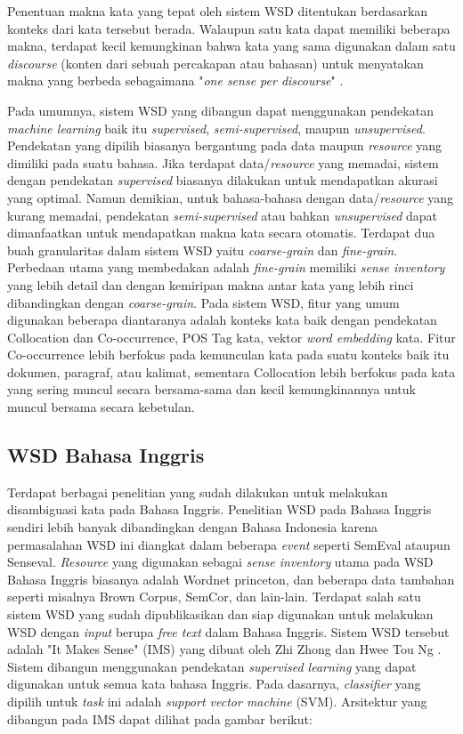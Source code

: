 Penentuan makna kata yang tepat oleh sistem WSD ditentukan berdasarkan konteks dari kata tersebut berada. Walaupun satu kata dapat memiliki beberapa makna, terdapat kecil kemungkinan bahwa kata yang sama digunakan dalam satu \textit{discourse} (konten dari sebuah percakapan atau bahasan) untuk menyatakan makna yang berbeda sebagaimana "\textit{one sense per discourse}" \citep{gale1992one}.

Pada umumnya, sistem WSD yang dibangun dapat menggunakan pendekatan \textit{machine learning} baik itu \textit{supervised}, \textit{semi-supervised}, maupun \textit{unsupervised}. Pendekatan yang dipilih biasanya bergantung pada data maupun \textit{resource} yang dimiliki pada suatu bahasa. Jika terdapat data/\textit{resource} yang memadai, sistem dengan pendekatan \textit{supervised} biasanya dilakukan untuk mendapatkan akurasi yang optimal. Namun demikian, untuk bahasa-bahasa dengan data/\textit{resource} yang kurang memadai, pendekatan \textit{semi-supervised} atau bahkan \textit{unsupervised} dapat dimanfaatkan untuk mendapatkan makna kata secara otomatis. Terdapat dua buah granularitas dalam sistem WSD yaitu \textit{coarse-grain} dan \textit{fine-grain}. Perbedaan utama yang membedakan adalah \textit{fine-grain} memiliki \textit{sense inventory} yang lebih detail dan dengan kemiripan makna antar kata yang lebih rinci dibandingkan dengan \textit{coarse-grain}. Pada sistem WSD, fitur yang umum digunakan beberapa diantaranya adalah konteks kata baik dengan pendekatan Collocation dan Co-occurrence, POS Tag kata, vektor \textit{word embedding} kata. Fitur Co-occurrence lebih berfokus pada kemunculan kata pada suatu konteks baik itu dokumen, paragraf, atau kalimat, sementara Collocation lebih berfokus pada kata yang sering muncul secara bersama-sama dan kecil kemungkinannya untuk muncul bersama secara kebetulan. 

\subsection{WSD Bahasa Inggris}
Terdapat berbagai penelitian yang sudah dilakukan untuk melakukan disambiguasi kata pada Bahasa Inggris. Penelitian WSD pada Bahasa Inggris sendiri lebih banyak dibandingkan dengan Bahasa Indonesia karena permasalahan WSD ini diangkat dalam beberapa \textit{event} seperti SemEval ataupun Senseval. \textit{Resource} yang digunakan sebagai \textit{sense inventory} utama pada WSD Bahasa Inggris biasanya adalah Wordnet princeton, dan beberapa data tambahan seperti misalnya Brown Corpus, SemCor, dan lain-lain. Terdapat salah satu sistem WSD yang sudah dipublikasikan dan siap digunakan untuk melakukan WSD dengan \textit{input} berupa \textit{free text} dalam Bahasa Inggris. Sistem WSD tersebut adalah "It Makes Sense" (IMS) yang dibuat oleh Zhi Zhong dan Hwee Tou Ng \citep{zhong2010makes}. Sistem  dibangun menggunakan pendekatan \textit{supervised learning} yang dapat digunakan untuk semua kata bahasa Inggris. Pada dasarnya, \textit{classifier} yang dipilih untuk \textit{task} ini adalah \textit{support vector machine} (SVM). Arsitektur yang dibangun pada IMS dapat dilihat pada gambar berikut:

